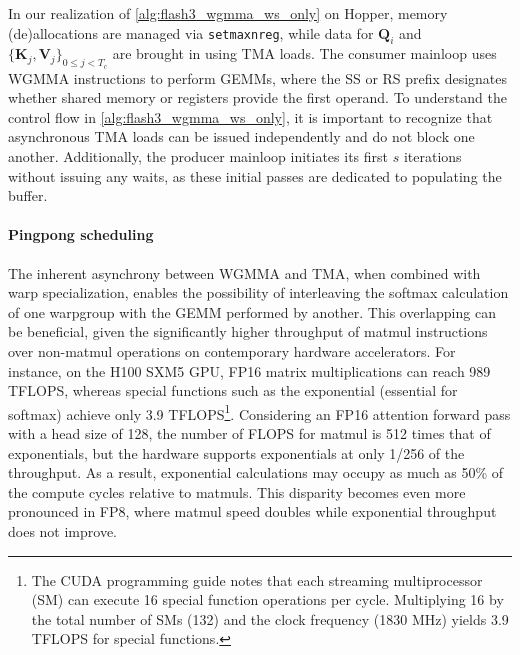 \begin{enumerate}
In our realization of \cref{alg:flash3_wgmma_ws_only} on Hopper, memory (de)allocations are managed via \verb|setmaxnreg|, while data for $\mathbf{Q}_i$ and $\{ \mathbf{K}_j, \mathbf{V}_j \}_{0 \leq j < T_c}$ are brought in using TMA loads. The consumer mainloop uses WGMMA instructions to perform GEMMs, where the SS or RS prefix designates whether shared memory or registers provide the first operand. To understand the control flow in \cref{alg:flash3_wgmma_ws_only}, it is important to recognize that asynchronous TMA loads can be issued independently and do not block one another. Additionally, the producer mainloop initiates its first $s$ iterations without issuing any waits, as these initial passes are dedicated to populating the buffer.

\paragraph{Pingpong scheduling} The inherent asynchrony between WGMMA and TMA, when combined with warp specialization, enables the possibility of interleaving the softmax calculation of one warpgroup with the GEMM performed by another. This overlapping can be beneficial, given the significantly higher throughput of matmul instructions over non-matmul operations on contemporary hardware accelerators. For instance, on the H100 SXM5 GPU, FP16 matrix multiplications can reach 989 TFLOPS, whereas special functions such as the exponential (essential for softmax) achieve only 3.9 TFLOPS\footnote{The CUDA programming guide notes that each streaming multiprocessor (SM) can execute 16 special function operations per cycle. Multiplying 16 by the total number of SMs (132) and the clock frequency (1830 MHz) yields 3.9 TFLOPS for special functions.}. Considering an FP16 attention forward pass with a head size of 128, the number of FLOPS for matmul is 512 times that of exponentials, but the hardware supports exponentials at only 1/256 of the throughput. As a result, exponential calculations may occupy as much as 50\% of the compute cycles relative to matmuls. This disparity becomes even more pronounced in FP8, where matmul speed doubles while exponential throughput does not improve.


\end{enumerate}
